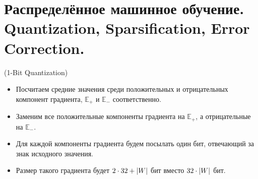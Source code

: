 \section{Распределённое машинное обучение. Quantization, Sparsification,
  Error Correction.}

\begin{algorithm}(1-Bit Quantization)
  \begin{itemize}
    \item Посчитаем средние значения среди положительных и
      отрицательных компонент градиента, $\mathbb{E}_+$ и $\mathbb{E}_-$
      соответственно.
    \item Заменим все положительные компоненты градиента на $\mathbb{E}_+$,
      а отрицательные на $\mathbb{E}_-$.
    \item Для каждой компоненты градиента будем посылать один бит, отвечающий
      за знак исходного значения.
    \item Размер такого градиента будет $2 \cdot 32 + \lvert W\rvert$ бит вместо
      $32 \cdot \lvert W\rvert$ бит.
  \end{itemize}
\end{algorithm}

